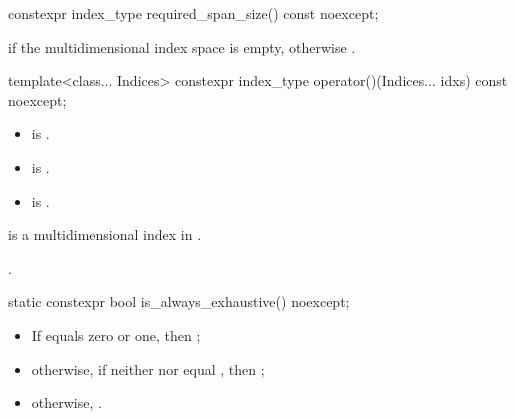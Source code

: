 %
\begin{itemdecl}
constexpr index_type required_span_size() const noexcept;
\end{itemdecl}

\begin{itemdescr}
\pnum
\returns
{} if the multidimensional index space  is empty,
otherwise .
\end{itemdescr}

%
\begin{itemdecl}
template<class... Indices>
  constexpr index_type operator()(Indices... idxs) const noexcept;
\end{itemdecl}

\begin{itemdescr}
\pnum
\constraints
\begin{itemize}
\item
{} is .
\item
{} is .
\item
{} is .
\end{itemize}

\pnum
\expects
{} is
a multidimensional index in .

\pnum
\returns
{}.
\end{itemdescr}

%
\begin{itemdecl}
static constexpr bool is_always_exhaustive() noexcept;
\end{itemdecl}

\begin{itemdescr}
\pnum
\returns
\begin{itemize}
\item
If  equals zero or one, then ;
\item
otherwise,
if neither  nor 
equal ,
then ;
\item
otherwise, .
\end{itemize}
\end{itemdescr}

